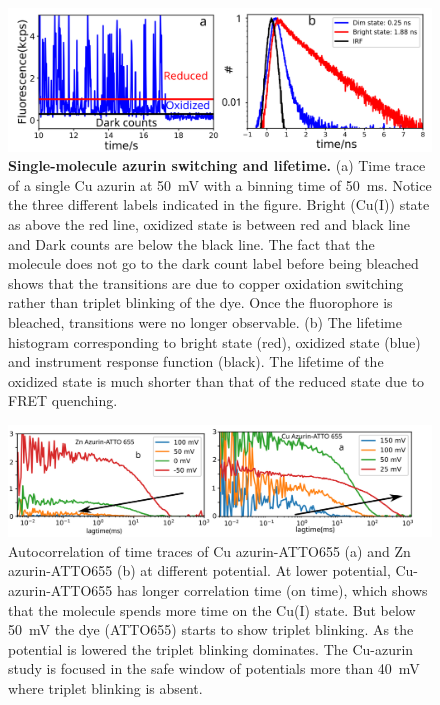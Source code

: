 \begin{figure}
  \centering
  \includegraphics[width=\textwidth]{lifetime}
  \makeatletter
  \renewcommand{\fnum@figure}{\figurename~S\thefigure}
  \makeatother
  \caption{\textbf{Single-molecule azurin switching and lifetime.} (a) Time trace of a single Cu azurin at \SI{50}{\mV} with a binning time of \SI{50}{\ms}.
  Notice the three different labels indicated in the figure.
  Bright (Cu(I)) state as above the red line, oxidized state is between red and black line and Dark counts are below the black line.
  The fact that the molecule does not go to the dark count label before being bleached shows that the transitions are due to copper oxidation switching rather than triplet blinking of the dye.
  Once the fluorophore is bleached, transitions were no longer observable.
  (b) The lifetime histogram corresponding to bright state (red), oxidized state (blue) and instrument response function (black).
  The lifetime of the oxidized state is much shorter than that of the reduced state due to FRET quenching.}
  \label{SIfig: lifetime}
\end{figure}
\begin{figure}[ht]
  \centering
  \includegraphics[width=\textwidth]{fcs_comparision}
  \makeatletter
  \renewcommand{\fnum@figure}{\figurename~S\thefigure}
  \makeatother
  \caption{Autocorrelation of time traces of Cu azurin-ATTO655 (a) and Zn azurin-ATTO655 (b) at different potential. 
  At lower potential, Cu-azurin-ATTO655 has longer correlation time (on time), which shows that the molecule spends more time on the Cu(I) state.
  But below \SI{50}{\mV} the dye (ATTO655) starts to show triplet blinking.
  As the potential is lowered the triplet blinking dominates.
  The Cu-azurin study is focused in the safe window of potentials more than \SI{40}{\mV} where triplet blinking is absent.}
  \label{SIfig:fcscomparision}
\end{figure}

